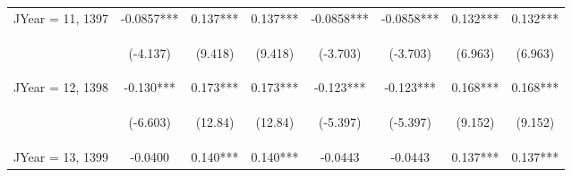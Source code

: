 \documentclass[]{article}
\begin{document}
\begin{center}
\begin{tabular}{lccccccc}
JYear = 11, 1397 & -0.0857*** & 0.137*** & 0.137*** & -0.0858*** & -0.0858*** & 0.132*** & 0.132*** \\
\vspace{4pt} & \begin{footnotesize}(-4.137)\end{footnotesize} & \begin{footnotesize}(9.418)\end{footnotesize} & \begin{footnotesize}(9.418)\end{footnotesize} & \begin{footnotesize}(-3.703)\end{footnotesize} & \begin{footnotesize}(-3.703)\end{footnotesize} & \begin{footnotesize}(6.963)\end{footnotesize} & \begin{footnotesize}(6.963)\end{footnotesize} \\
JYear = 12, 1398 & -0.130*** & 0.173*** & 0.173*** & -0.123*** & -0.123*** & 0.168*** & 0.168*** \\
\vspace{4pt} & \begin{footnotesize}(-6.603)\end{footnotesize} & \begin{footnotesize}(12.84)\end{footnotesize} & \begin{footnotesize}(12.84)\end{footnotesize} & \begin{footnotesize}(-5.397)\end{footnotesize} & \begin{footnotesize}(-5.397)\end{footnotesize} & \begin{footnotesize}(9.152)\end{footnotesize} & \begin{footnotesize}(9.152)\end{footnotesize} \\
JYear = 13, 1399 & -0.0400 & 0.140*** & 0.140*** & -0.0443 & -0.0443 & 0.137*** & 0.137*** \\

\end{tabular}
\end{center}
\end{document}
